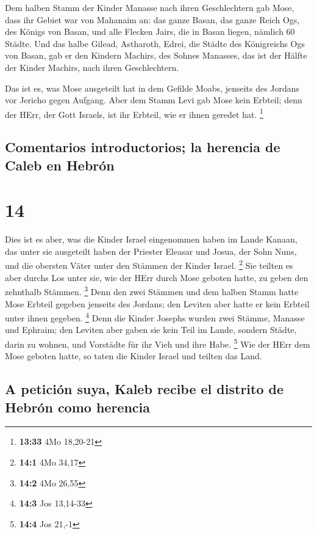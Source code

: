  Dem halben Stamm der Kinder Manasse nach ihren
Geschlechtern gab Mose,  dass ihr Gebiet war von Mahanaim
an: das ganze Basan, das ganze Reich Ogs, des Königs von Basan, und alle
Flecken Jairs, die in Basan liegen, nämlich 60 Städte. 
Und das halbe Gilead, Astharoth, Edrei, die Städte des Königreichs Ogs
von Basan, gab er den Kindern Machirs, des Sohnes Manasses, das ist der
Hälfte der Kinder Machirs, nach ihren Geschlechtern.

 Das ist es, was Mose ausgeteilt hat in dem Gefilde
Moabs, jenseits des Jordans vor Jericho gegen Aufgang. 
Aber dem Stamm Levi gab Mose kein Erbteil; denn der HErr, der Gott
Israels, ist ihr Erbteil, wie er ihnen geredet hat. \footnote{\textbf{13:33}
  4Mo 18,20-21}

\hypertarget{comentarios-introductorios-la-herencia-de-caleb-en-hebruxf3n}{%
\subsection{Comentarios introductorios; la herencia de Caleb en
Hebrón}\label{comentarios-introductorios-la-herencia-de-caleb-en-hebruxf3n}}

\hypertarget{section-13}{%
\section{14}\label{section-13}}

 Dies ist es aber, was die Kinder Israel eingenommen haben
im Lande Kanaan, das unter sie ausgeteilt haben der Priester Eleasar und
Josua, der Sohn Nuns, und die obersten Väter unter den Stämmen der
Kinder Israel. \footnote{\textbf{14:1} 4Mo 34,17}  Sie
teilten es aber durchs Los unter sie, wie der HErr durch Mose geboten
hatte, zu geben den zehnthalb Stämmen. \footnote{\textbf{14:2} 4Mo 26,55}
 Denn den zwei Stämmen und dem halben Stamm hatte Mose
Erbteil gegeben jenseits des Jordans; den Leviten aber hatte er kein
Erbteil unter ihnen gegeben. \footnote{\textbf{14:3} Jos 13,14-33}
 Denn die Kinder Josephs wurden zwei Stämme, Manasse und
Ephraim; den Leviten aber gaben sie kein Teil im Lande, sondern Städte,
darin zu wohnen, und Vorstädte für ihr Vieh und ihre Habe. \footnote{\textbf{14:4}
  Jos 21,-1}  Wie der HErr dem Mose geboten hatte, so
taten die Kinder Israel und teilten das Land.

\hypertarget{a-peticiuxf3n-suya-kaleb-recibe-el-distrito-de-hebruxf3n-como-herencia}{%
\subsection{A petición suya, Kaleb recibe el distrito de Hebrón como
herencia}\label{a-peticiuxf3n-suya-kaleb-recibe-el-distrito-de-hebruxf3n-como-herencia}}

